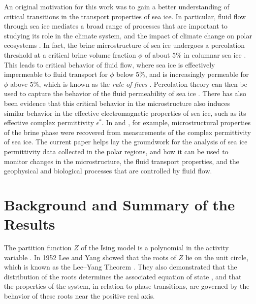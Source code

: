 \documentclass[english,12pt,jmp,graphicx]{revtex4-1}
\begin{document}
An original motivation for this work was to gain a better
understanding of critical transitions in the transport properties of
sea ice. In particular, fluid flow through sea ice mediates a broad
range of processes that are important to studying its role in the
climate system, and the impact of climate change on polar ecosystems
\cite{Golden:NAMS:2009}. In fact, the brine microstructure of sea ice
undergoes a percolation threshold at a critical brine volume fraction
$\phi$ of about 5\% in columnar sea ice
\cite{Golden:S-2238,Golden:2007:GRL,Pringle:JGR:2009}. 
This leads to critical behavior of fluid flow, where sea ice is effectively
impermeable to fluid transport for $\phi$
below 5\%, and is increasingly permeable for $\phi$ above 5\%, which is
known as the {\it rule of fives} \cite{Golden:S-2238}.
Percolation theory can then be used to capture the behavior of
the fluid permeability of sea ice \cite{Golden:2007:GRL}.
There has also been evidence \cite{Gully:PhysB:357,Orum:PRSLA:2011}
that this critical behavior in the
microstructure also induces similar behavior in the effective electromagnetic
properties of sea ice, such as its effective complex permittivity $\epsilon^*$.
In \cite{Gully:PhysB:357} and \cite{Orum:PRSLA:2011}, for example,
microstructural properties of the brine phase were recovered from
measurements of the complex permittivity of sea ice.
The current paper helps lay the groundwork for the analysis of
sea ice permittivity data collected in the polar regions, and how it can
be used to monitor changes in the microstructure, the fluid transport properties,
and the geophysical and biological processes that are controlled by
fluid flow.



\section{Background and Summary of the Results}\label{sec:Background}
%
The partition function $Z$ of the Ising model is a polynomial
in the activity variable \cite{Lee:PR:411,Baker-1990,Ruelle-1969,Ruelle:AM:589}.
In 1952 Lee and Yang \cite{Lee:PR:411} showed that the 
roots of $Z$ lie on the unit circle, which is
known as the Lee--Yang Theorem \cite{Lee:PR:411,Ruelle-1969}.
They also demonstrated that 
the distribution of the roots determines 
the associated equation of state
\cite{Yang:PR:404}, and that the properties of 
the system, in relation to phase transitions, are governed by the
behavior of these roots near the positive real axis.   
\end{document}
